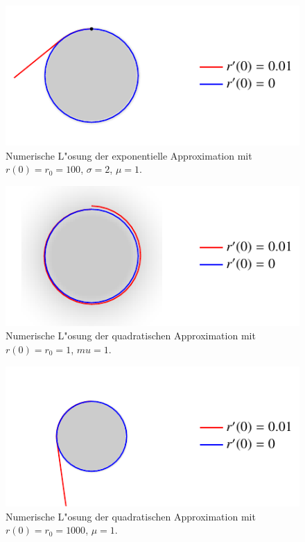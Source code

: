 \begin{refsection}
\begin{figure}
\end{figure}

\begin{figure}
  \centering
  \includegraphics[scale=1]{licht/standalone/fig_kreis_exp2.pdf}
  \caption{Numerische L"osung der exponentielle Approximation mit $r(0) = r_0 = 100$, $\sigma = 2$, $\mu = 1$. \label{fig:sphere_special2}} 
  
\end{figure}

\begin{figure}
  \centering
  \includegraphics[scale=1]{licht/standalone/fig_kreis_square1.pdf}
  \caption{Numerische L"osung der quadratischen Approximation mit $r(0) = r_0 = 1$, $mu = 1$. \label{fig:sphere_special3} }
  
\end{figure}

\begin{figure}
  \centering
  \includegraphics[scale=1]{licht/standalone/fig_kreis_square2.pdf}
  \caption{Numerische L"osung der quadratischen Approximation mit $r(0) = r_0 = 1000$,  $\mu = 1$. \label{fig:sphere_special4} } 
\end{figure}


\end{refsection}
